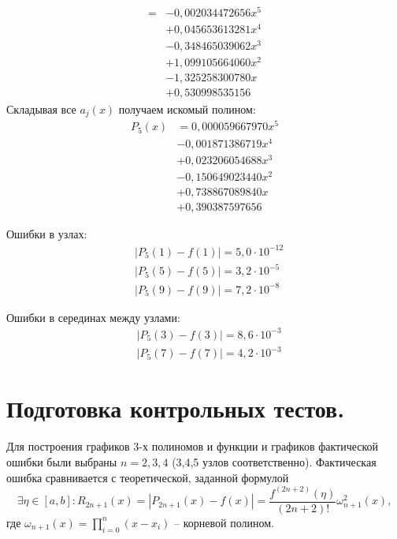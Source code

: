 \documentclass[a4paper, 12pt]{article}
\begin{document}
\begin{itemize}
\begin{equation*}
\begin{aligned}
			   =&-0,002034472656x^5\\
				&+0,045653613281x^4\\
				&-0,348465039062x^3\\
				&+1,099105664060x^2\\ 
				&-1,325258300780x\\
				&+0,530998535156
			\end{aligned}
		\end{equation*}
		Складывая все $a_j(x)$ получаем искомый полином:
		\begin{equation*}
			\begin{aligned}
				P_5(x)&=0,000059667970x^{5}\\
					  &-0,001871386719x^{4}\\
					  &+0,023206054688x^{3}\\
					  &-0,150649023440x^{2}\\
					  &+0,738867089840x\\
					  &+0,390387597656
			\end{aligned}
		\end{equation*}
	\end{itemize}
	
	Ошибки в узлах:
	\begin{equation*}
		\begin{aligned}
			&|P_5(1)-f(1)|=5,0\cdot10^{-12}\\
			&|P_5(5)-f(5)|=3,2\cdot10^{-5}\\
			&|P_5(9)-f(9)|=7,2\cdot10^{-8}
		\end{aligned}
	\end{equation*}

	Ошибки в серединах между узлами:
	\begin{equation*}
		\begin{aligned}
			&|P_5(3)-f(3)|=8,6\cdot10^{-3}\\
			&|P_5(7)-f(7)|=4,2\cdot10^{-3}
		\end{aligned}
	\end{equation*}
	
	\section{Подготовка контрольных тестов.}
	
    Для построения графиков 3-х полиномов и функции и графиков фактической ошибки были выбраны $n=2,3,4$ (3,4,5 узлов соответственно). Фактическая ошибка сравнивается с теоретической, заданной формулой
    \begin{equation} \label{theor_err}
    	\exists \eta \in[a,b]:R_{2n+1}(x)=|P_{2n+1}(x)-f(x)|=\frac{f^{(2n+2)}(\eta)}{(2n+2)!}\omega^2_{n+1}(x),
    \end{equation} 
	где $\displaystyle \omega_{n+1}(x)=\prod\limits_{i=0}^n(x-x_i)$ -- корневой полином.
	
\end{document}
